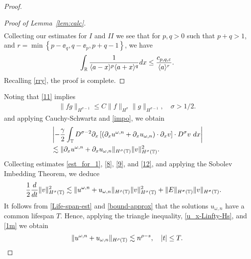 \begin{proof}
\begin{proof}[Proof of Lemma~\ref{lem:calc}]
\begin{equation*}
\begin{split}
\end{split}
\end{equation*}
%
%
Collecting our estimates for $I$ and $II$ we see that for 
$p, q > 0$ such that $p +q >1$, and $r =\min\left\{p -\ee_{q}, q - \ee_{p}, p+q-1
 \right\}$, we have
\begin{align*}
  \int_{\mathbb{R}} \frac{1}{\langle a - x \rangle ^{p} \langle a + x \rangle
  ^{q}} d x
  \le \frac{c_{p,q, \varepsilon}}{\langle a \rangle ^{r}}.
    \label{est-2}
\end{align*}
Recalling
\eqref{rry}, the proof is complete.
\end{proof}
%
%
Noting that \cref{11} implies
%
%
%
\begin{equation}
\label{impo}
\begin{split}
\|fg\|_{H^{\sigma - 1}} \le C \|f\|_{H^{\sigma}}
\|g\|_{H^{\sigma -1}}, \quad \sigma > 1/2.
\end{split}
\end{equation}
%
%
%
and applying Cauchy-Schwartz and  \eqref{impo}, we obtain
%
%
\begin{equation}
\begin{split}
& \left | -\frac{\gamma}{2} \int_{\mathbb{T}} D^{\sigma -2 } \partial_x \left[
\left( \partial_x u^{\omega,n} + \partial_x u_{\omega,n} \right) \cdot \partial_x v
\right] \cdot D^\sigma v \ dx \right |
\\
& \lesssim \|\partial_x u^{\omega,n} + \partial_x u_{\omega,n}
\|_{H^\sigma(\mathbb{T})} \|v\|_{H^\sigma(\mathbb{T})}^2.
\label{12}
\end{split}
\end{equation}
%
%
Collecting estimates \eqref{est_for_1}, \eqref{8}, \eqref{9}, and
\eqref{12}, and applying the Sobolev Imbedding Theorem, we deduce
%
%
\begin{equation}
\begin{split}
\frac{1}{2}\frac{d}{dt} \|v\|_{H^\sigma(\mathbb{T})}^2
& \lesssim
\|u^{\omega,n} + u_{\omega,n}\|_{H^{\rho}(\mathbb{T})} \|v\|_{H^\sigma(\mathbb{T})}^2
+ \|E\|_{H^\sigma(\mathbb{T})}
\|v\|_{H^\sigma(\mathbb{T})}.
\label{10}
\end{split}
\end{equation}
%
%
It follows from \eqref{Life-span-est} and 
\eqref{bound-approx} that the solutions $u_{\omega,n}$ have a common 
lifespan $T$. Hence, applying the triangle inequality, 
\eqref{u_x-Linfty-Hs}, and \eqref{1m} we obtain  
%
%
\begin{equation}
\|u^{\omega,n} + u_{\omega,n}\|_{H^\rho(\mathbb{T})} \lesssim n^{\rho -s}, 
\quad |t| \le T.
\label{3r}
\end{equation}
%
%
%
%
%
%

\end{proof}
